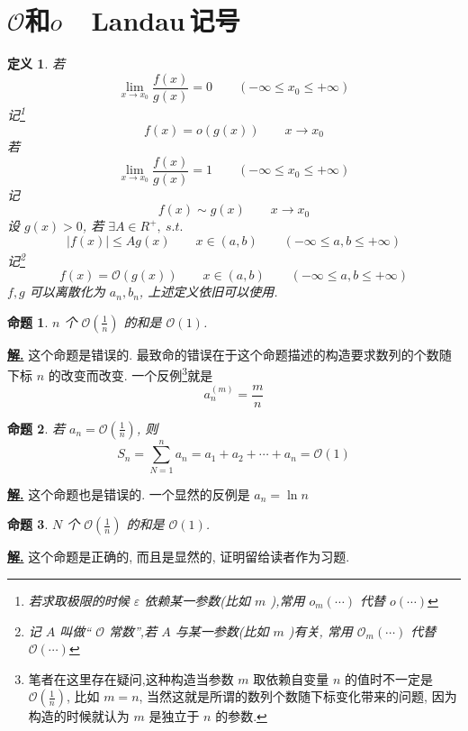\documentclass[10pt,a4paper]{book}
\theoremstyle{thmstyle} %
\theoremstyle{defstyle} %
\newtheorem{definition}{定义}[chapter]
\theoremstyle{prostyle} %
\newtheorem{proposition}{命题}[chapter]
\newenvironment{solution}{\par\underline{\textbf{解.}} \;\kaishu}{\par}
\begin{document}
	\section{$\mathcal{O}$和$o$\ \textemdash \ Landau\,记号\textsuperscript{\cite{PCD}}}
	\begin{definition}
		若
		$$
		\lim_{x\rightarrow x_0} \frac{f\left( x \right)}{g\left( x \right)}=0\quad\quad(-\infty\leqslant x_0\leqslant+\infty)
		$$
		记\footnote{若求取极限的时候 $\varepsilon$ 依赖某一参数(比如 $m$ ),常用 $o_m(\dotsb)$ 代替 $o(\dotsb)$ }
		$$
		f(x)=o(g(x))\quad\quad x\rightarrow x_0
		$$
		若
		$$
		\lim_{x\rightarrow x_0} \frac{f\left( x \right)}{g\left( x \right)}=1\quad\quad(-\infty\leqslant x_0\leqslant+\infty)
		$$
		记
		$$
		f(x)\sim g(x)\quad\quad x\rightarrow x_0
		$$
		设 $g(x)>0$, 若 $\exists A\in R^+,\ s.t.$
		$$
		|f\left( x \right) |\leqslant Ag\left( x \right) \quad\quad x\in(a,b)\quad\quad(-\infty\leqslant a,b\leqslant+\infty)
		$$
		记\footnote{记 $A$ 叫做“ $\mathcal{O}$ 常数”,若 $A$ 与某一参数(比如 $m$ )有关, 常用 $\mathcal{O}_m(\dotsb)$ 代替 $\mathcal{O}(\dotsb)$ }
		$$
		f(x)=\mathcal{O}(g(x))\quad\quad x\in(a,b)\quad\quad(-\infty\leqslant a,b\leqslant+\infty)
		$$
		$f,g$ 可以离散化为 $a_n,b_n$, 上述定义依旧可以使用.
	\end{definition}
	\begin{proposition}
		$n$ 个 $\mathcal{O}\left(\frac{1}{n}\right)$ 的和是 $\mathcal{O}(1)$.
	\end{proposition}
	\begin{solution}
		这个命题是错误的. 最致命的错误在于这个命题描述的构造要求数列的个数随下标 $n$ 的改变而改变. 一个反例\footnote{笔者在这里存在疑问,这种构造当参数 $m$ 取依赖自变量 $n$ 的值时不一定是 $\mathcal{O}(\frac{1}{n})$, 比如 $m=n$, 当然这就是所谓的数列个数随下标变化带来的问题, 因为构造的时候就认为 $m$ 是独立于 $n$ 的参数.}就是
		$$
		a_{n}^{\left( m \right)}=\frac{m}{n}
		$$
	\end{solution}
	\begin{proposition}
		若 $a_n=\mathcal{O}(\frac{1}{n})$, 则$$S_n=\sum\limits_{N=1}^n{a_n=a_1+a_2+\dotsb+a_n=\mathcal{O} \left( 1 \right)}$$
	\end{proposition}
	\begin{solution}
		这个命题也是错误的. 一个显然的反例是 $a_n=\ln n$
	\end{solution}
	\begin{proposition}
		$N$ 个 $\mathcal{O}(\frac{1}{n})$ 的和是 $\mathcal{O}(1)$.
	\end{proposition}
	\begin{solution}
		这个命题是正确的, 而且是显然的, 证明留给读者作为习题.
	\end{solution}
\end{document}
